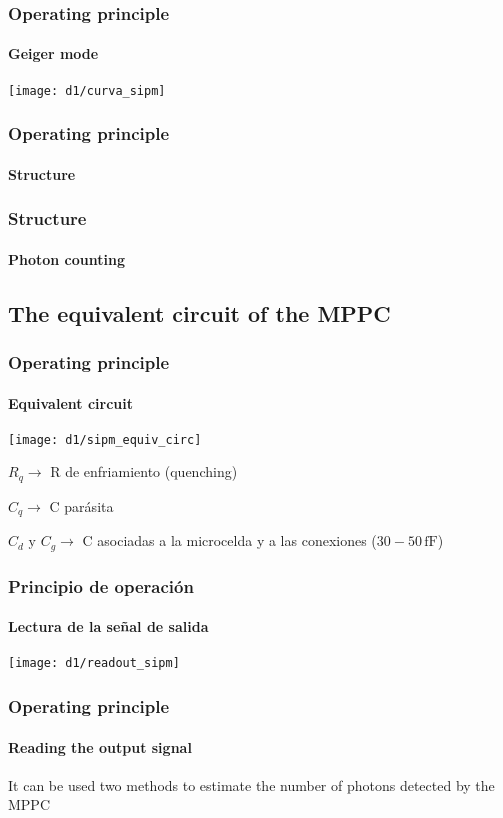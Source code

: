 \documentclass{beamer}
\begin{document}
\begin{frame}
\frametitle{Operating principle}
\framesubtitle{Geiger mode}
\begin{center}
\texttt{[image: d1/curva\_sipm]}
\end{center}
\end{frame}

\begin{frame}
\frametitle{Operating principle}
\framesubtitle{Structure}
\begin{center}
\end{center}
\end{frame}

\begin{frame}
\frametitle{Structure}
\framesubtitle{Photon counting}
\begin{center}
\end{center}
\end{frame}

\subsection{The equivalent circuit of the MPPC}

\begin{frame}
\frametitle{Operating principle}
\framesubtitle{Equivalent circuit}
\begin{center}
\texttt{[image: d1/sipm\_equiv\_circ]}
\end{center}

$R_q \rightarrow$ R de enfriamiento (quenching)

$C_q \rightarrow$ C par\'asita

$C_d\,\,\text{y}\,\,C_g \rightarrow$ C asociadas a la microcelda y a las
conexiones ($30-50\,\text{fF}$)
\end{frame}

\begin{frame}
\frametitle{Principio de operaci\'on}
\framesubtitle{Lectura de la señal de salida}
\texttt{[image: d1/readout\_sipm]}
\end{frame}

\begin{frame}
\frametitle{Operating principle}
\framesubtitle{Reading the output signal}
It can be used two methods to estimate the number of photons detected by the
MPPC


\end{frame}
\end{document}
